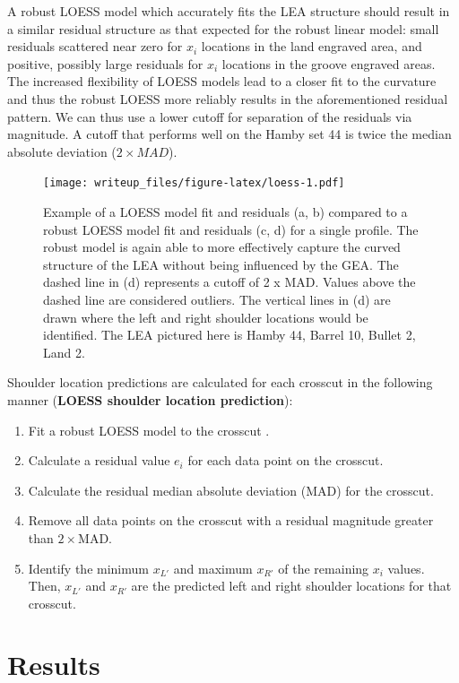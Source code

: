 \documentclass[12pt]{article}
\begin{document}
A robust LOESS model which accurately fits the LEA structure should
result in a similar residual structure as that expected for the robust
linear model: small residuals scattered near zero for \(x_i\) locations
in the land engraved area, and positive, possibly large residuals for
\(x_i\) locations in the groove engraved areas. The increased
flexibility of LOESS models lead to a closer fit to the curvature and
thus the robust LOESS more reliably results in the aforementioned
residual pattern. We can thus use a lower cutoff for separation of the
residuals via magnitude. A cutoff that performs well on the Hamby set 44
is twice the median absolute deviation (\(2 \times MAD\)).

\begin{figure}
\centering
\texttt{[image: writeup\_files/figure-latex/loess-1.pdf]}
\caption{\label{loess}Example of a LOESS model fit and residuals (a, b)
compared to a robust LOESS model fit and residuals (c, d) for a single
profile. The robust model is again able to more effectively capture the
curved structure of the LEA without being influenced by the GEA. The
dashed line in (d) represents a cutoff of 2 x MAD. Values above the
dashed line are considered outliers. The vertical lines in (d) are drawn
where the left and right shoulder locations would be identified. The LEA
pictured here is Hamby 44, Barrel 10, Bullet 2, Land 2.}
\end{figure}

Shoulder location predictions are calculated for each crosscut in the
following manner (\textbf{LOESS shoulder location prediction}):

\begin{enumerate}
\item Fit a robust LOESS model to the crosscut \citep{locfit}.
\item Calculate a residual value $e_i$ for each data point on the crosscut.  
\item Calculate the residual median absolute deviation (MAD) for the crosscut.  
\item Remove all data points on the crosscut with a residual magnitude greater than $2 \times$MAD.  
\item Identify the minimum $x_{L'}$ and maximum $x_{R'}$ of the remaining $x_i$ values. Then, $x_{L'}$ and $x_{R'}$ are the predicted left and right shoulder locations for that crosscut.   
\end{enumerate}

\section{Results}
\end{document}
